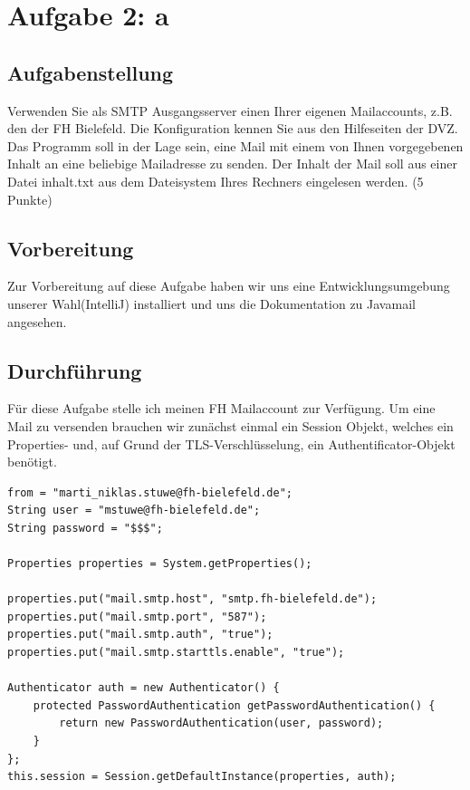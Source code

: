 \newpage
\section{Aufgabe 2: a}

\subsection{Aufgabenstellung}
Verwenden Sie als SMTP Ausgangsserver einen Ihrer eigenen Mailaccounts, z.B. den der
FH Bielefeld. Die Konfiguration kennen Sie aus den Hilfeseiten der DVZ. Das Programm
soll in der Lage sein, eine Mail mit einem von Ihnen vorgegebenen Inhalt an eine beliebige Mailadresse zu senden. Der Inhalt der Mail soll aus einer Datei inhalt.txt aus dem
Dateisystem Ihres Rechners eingelesen werden. (5 Punkte)


\subsection{Vorbereitung}
Zur Vorbereitung auf diese Aufgabe haben wir uns eine Entwicklungsumgebung unserer Wahl(IntelliJ) installiert und uns die Dokumentation zu Javamail angesehen.

\subsection{Durchführung}
Für diese Aufgabe stelle ich meinen FH Mailaccount zur Verfügung. Um eine Mail zu versenden brauchen wir zunächst einmal ein Session Objekt, welches ein Properties- und, auf Grund der TLS-Verschlüsselung, ein Authentificator-Objekt benötigt. 

\lstset{language=Java}
\begin{lstlisting}
from = "marti_niklas.stuwe@fh-bielefeld.de";
String user = "mstuwe@fh-bielefeld.de";
String password = "$$$";

Properties properties = System.getProperties();

properties.put("mail.smtp.host", "smtp.fh-bielefeld.de");
properties.put("mail.smtp.port", "587");
properties.put("mail.smtp.auth", "true");
properties.put("mail.smtp.starttls.enable", "true");

Authenticator auth = new Authenticator() {
	protected PasswordAuthentication getPasswordAuthentication() {
		return new PasswordAuthentication(user, password);
	}
};
this.session = Session.getDefaultInstance(properties, auth);
\end{lstlisting}

